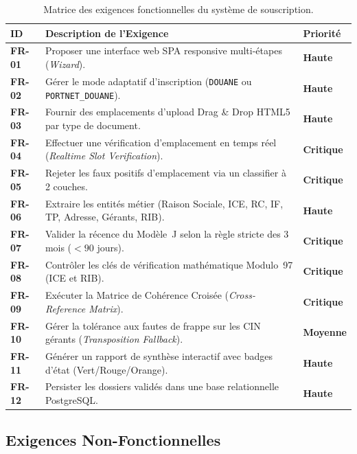 \begin{table}[H]
\centering
\small
\begin{tabularx}{\textwidth}{@{}>{\bfseries}p{1.5cm} Y >{\bfseries}p{2cm}@{}}
\toprule
{}
ID & Description de l'Exigence & Priorit\'{e} \\
\midrule
FR-01 & Proposer une interface web SPA responsive multi-\'{e}tapes (\textit{Wizard}). & Haute \\
FR-02 & G\'{e}rer le mode adaptatif d'inscription (\texttt{DOUANE} ou \texttt{PORTNET\_DOUANE}). & Haute \\
FR-03 & Fournir des emplacements d'upload Drag \& Drop HTML5 par type de document. & Haute \\
FR-04 & Effectuer une v\'{e}rification d'emplacement en temps r\'{e}el (\textit{Realtime Slot Verification}). & Critique \\
FR-05 & Rejeter les faux positifs d'emplacement via un classifier \`{a} 2 couches. & Critique \\
FR-06 & Extraire les entit\'{e}s m\'{e}tier (Raison Sociale, ICE, RC, IF, TP, Adresse, G\'{e}rants, RIB). & Haute \\
FR-07 & Valider la r\'{e}cence du Mod\`{e}le~J selon la r\`{e}gle stricte des 3 mois ($< 90$ jours). & Critique \\
FR-08 & Contr\^{o}ler les cl\'{e}s de v\'{e}rification math\'{e}matique Modulo~97 (ICE et RIB). & Critique \\
FR-09 & Ex\'{e}cuter la Matrice de Coh\'{e}rence Crois\'{e}e (\textit{Cross-Reference Matrix}). & Critique \\
FR-10 & G\'{e}rer la tol\'{e}rance aux fautes de frappe sur les CIN g\'{e}rants (\textit{Transposition Fallback}). & Moyenne \\
FR-11 & G\'{e}n\'{e}rer un rapport de synth\`{e}se interactif avec badges d'\'{e}tat (Vert/Rouge/Orange). & Haute \\
FR-12 & Persister les dossiers valid\'{e}s dans une base relationnelle PostgreSQL. & Haute \\
\bottomrule
\end{tabularx}
\caption{Matrice des exigences fonctionnelles du syst\`{e}me de souscription.}
\label{tab:exigences-fonctionnelles}
\end{table}

\subsection{Exigences Non-Fonctionnelles}

